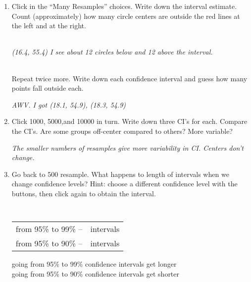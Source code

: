 \begin{enumerate}
\begin{enumerate}
\item  Click   in the ``Many Resamples'' choices.
 Write down the interval estimate.  Count
      (approximately) how many circle centers are outside the red
      lines at the left and at the right.
\begin{students}
        \vspace{1cm}        
\end{students}
\begin{key}
  \\{\it (16.4, 55.4)  I see about 12 circles below and  12 above the interval.}
\end{key}
\\
  Repeat twice more. Write down each confidence interval and guess how
  many points fall outside each.
\begin{students}
        \vspace{1cm}        
\end{students}
\begin{key}
{\it AWV. I got (18.1, 54.9), (18.3, 54.9)}
\end{key}

\item Click  1000,  5000,and 10000 in turn. Write down
  three CI's for each.  Compare the CI's.  Are some groups off-center compared
  to others?  More variable?

\begin{students}
\vspace{4cm}
\end{students}
\begin{key}
  {\it The smaller numbers of resamples give more variability in
    CI. Centers don't change.}
\end{key}


\item Go back to 500 resample.  What happens to length of intervals
  when we change confidence levels?  Hint: choose a different
  confidence level with the buttons, then click  again
  to obtain the interval.\\
\begin{students}
{\large \tt
\begin{tabular}{rc}
from 95\% to 99\% --	&	intervals  \underline{\hspace*{2in}}\\
from 95\% to 90\% --	&	intervals \underline{\hspace*{2in}}\\
\end{tabular}
}
\end{students}
\begin{key}
going from 95\% to 99\%  confidence 	intervals get longer\\
going from 95\% to 90\%  confidence 	intervals get shorter
\end{key}
    \end{enumerate}



\end{enumerate}
